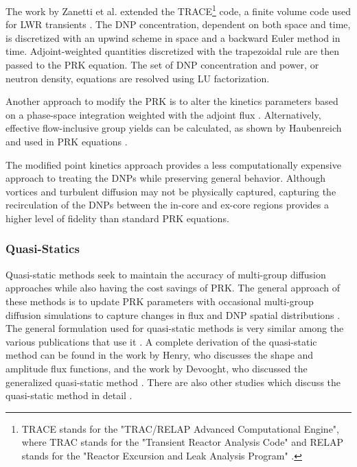 The work by Zanetti et al. extended the TRACE\footnote{TRACE stands for the "TRAC/RELAP Advanced Computational Engine", where TRAC stands for the "Transient Reactor Analysis Code" and RELAP stands for the "Reactor Excursion and Leak Analysis Program" \cite{zhang2021development,TRAC1985guide}.} code, a finite volume code used for \gls{LWR} transients \cite{zanetti2015extension}.
The \gls{DNP} concentration, dependent on both space and time, is discretized with an upwind scheme in space and a backward Euler method in time.
Adjoint-weighted quantities discretized with the trapezoidal rule are then passed to the \gls{PRK} equation.
The set of \gls{DNP} concentration and power, or neutron density, equations are resolved using LU factorization.

Another approach to modify the \gls{PRK} is to alter the kinetics parameters based on a phase-space integration weighted with the adjoint flux \cite{lapenta2000basic}.
Alternatively, effective flow-inclusive group yields can be calculated, as shown by Haubenreich and used in \gls{PRK} equations \cite{haubenreich1962prediction}.

The modified point kinetics approach provides a less computationally expensive approach to treating the \glspl{DNP} while preserving general behavior.
Although vortices and turbulent diffusion may not be physically captured, capturing the recirculation of the \glspl{DNP} between the in-core and ex-core regions provides a higher level of fidelity than standard \gls{PRK} equations.

\subsubsection{Quasi-Statics}

Quasi-static methods seek to maintain the accuracy of multi-group diffusion approaches while also having the cost savings of \gls{PRK}.
The general approach of these methods is to update \gls{PRK} parameters with occasional multi-group diffusion simulations to capture changes in flux and \gls{DNP} spatial distributions \cite{wooten2018review}.
The general formulation used for quasi-static methods is very similar among the various publications that use it \cite{dulla2004neutron, tano2023coupled}.
A complete derivation of the quasi-static method can be found in the work by Henry, who discusses the shape and amplitude flux functions, and the work by Devooght, who discussed the generalized quasi-static method \cite{henry1958application, devooght1980quasistatic}.
There are also other studies which discuss the quasi-static method in detail \cite{becker1968generalized}.

